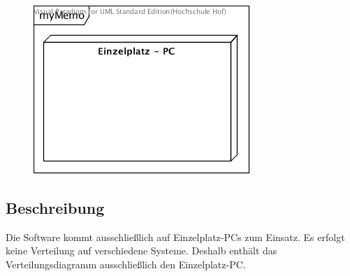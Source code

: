 \begin{figure}[!h]
	\centering
    \includegraphics[width=\textwidth]{./verteilungsdiagramm.png}
	\label{layout_gesamt}
\end{figure}
\subsection{Beschreibung}
Die Software kommt ausschließlich auf Einzelplatz-PCs zum Einsatz. Es erfolgt keine Verteilung auf verschiedene Systeme. Deshalb enthält das Verteilungsdiagramm ausschließlich den Einzelplatz-PC.




